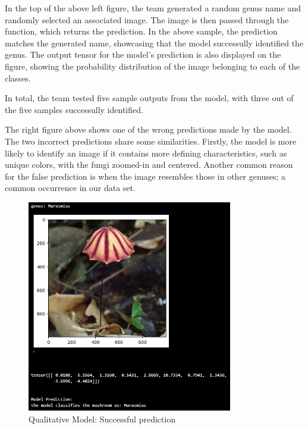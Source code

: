 \documentclass{article} %
\begin{document}
In the top of the above left figure, the team generated a random genus name and randomly selected an associated image. The image is then passed through the function, which returns the prediction. In the above sample, the prediction matches the generated name, showcasing that the model successully identified the genus. The output tensor for the model's prediction is also displayed on the figure, showing the probability distribution of the image belonging to each of the classes.

In total, the team tested five sample outputs from the model, with three out of the five samples successully identified. 

The right figure above shows one of the wrong predictions made by the model. The two incorrect predictions share some similarities. Firstly, the model is more likely to identify an image if it contains more defining characteristics, such as unique colors, with the fungi zoomed-in and centered. Another common reason for the false prediction is when the image resembles those in other genuses; a common occurrence in our data set.

\FloatBarrier
\begin{figure}[h]
    \begin{center}
    \includegraphics[width=0.8\textwidth]{figures/qualitativeResultImg3.png}
    \end{center}
    \caption{Qualitative Model: Successful prediction}
    \label{fig:goodPrediction2}
\end{figure}
\FloatBarrier
\end{document}
